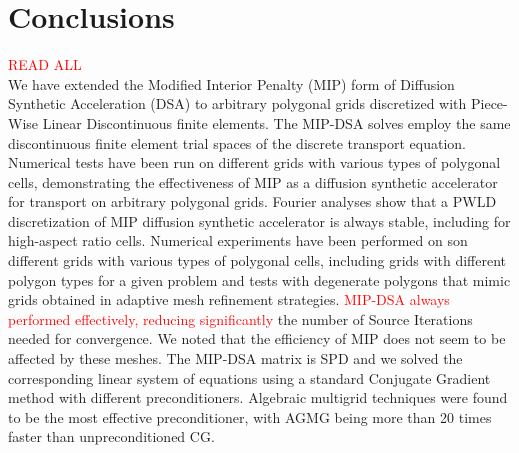 \section{Conclusions} \label{sec_conc}
\textcolor{red}{READ ALL}\\
We have extended the Modified Interior Penalty (MIP) form of Diffusion Synthetic Acceleration (DSA) 
to arbitrary polygonal grids discretized with Piece-Wise Linear Discontinuous finite elements. 
The MIP-DSA solves employ the same discontinuous finite element trial spaces of the discrete \sn
transport equation.
%
Numerical tests have been run on different grids with various types of polygonal cells,
demonstrating the effectiveness of MIP as a diffusion synthetic accelerator for 
\sn transport on arbitrary polygonal grids.
%
%
Fourier analyses show that a PWLD discretization of MIP diffusion synthetic accelerator 
is always stable, including for high-aspect ratio cells. 
%
Numerical experiments have been performed on son different grids with various types of polygonal cells, including
grids with different polygon types for a given problem and tests with degenerate polygons that mimic
grids obtained in adaptive mesh refinement strategies. \textcolor{red}{MIP-DSA always performed effectively,
reducing significantly} the number of Source Iterations needed for convergence. 
We noted that the efficiency of MIP does not seem to be affected by these meshes. 
%
The MIP-DSA  matrix is SPD and we solved the corresponding linear system of equations using a standard Conjugate
Gradient method with different preconditioners. 
Algebraic multigrid techniques were found to be the most effective preconditioner, with AGMG being more than 20 times
faster than unpreconditioned CG.

